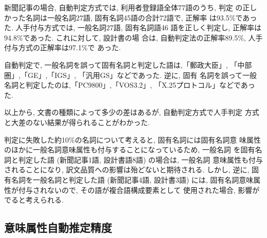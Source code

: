新聞記事の場合, 自動判定方式では, 利用者登録語全体77語のうち, 判定
の正しかった名詞は一般名詞27語, 固有名詞45語の合計72語で, 正解率
は93.5\%であった. 人手付与方式では, 一般名詞27語, 固有名詞語46
語を正しく判定し, 正解率は94.8\%であった. これに対して, 設計書の場
合は, 自動判定法の正解率89.5\%, 人手付与方式の正解率は97.1\%で
あった. 

自動判定で, 一般名詞を誤って固有名詞と判定した語は,「郵政大臣」,
「中部圏」,「GE」,「IGS」, 「汎用GS」などであった. 逆に, 固有
名詞を誤って一般名詞と判定したのは,「PC9800」,「VOS3.2」,
「X.25プロトコル」などであった. 

以上から, 文書の種類によって多少の差はあるが, 自動判定方式で人手判定
方式と大差のない結果が得られることがわかった.  

判定に失敗した約10\%の名詞について考えると, 固有名詞には固有名詞意
味属性のほかに一般名詞意味属性も付与することになっているため, 一般名詞
を固有名詞と判定した語 (新聞記事1語, 設計書語8語) の場合は, 一般名詞
意味属性も付与されることになり, 訳文品質への影響は殆どないと期待される. 
しかし, 逆に, 固有名詞を一般名詞と判定した語 (新聞記事4語, 設計書3語) 
には, 固有名詞意味属性が付与されないので, その語が複合語構成要素として
使用された場合, 影響がでると考えられる.  


\subsection{意味属性自動推定精度}
\label{sec:4.3}



